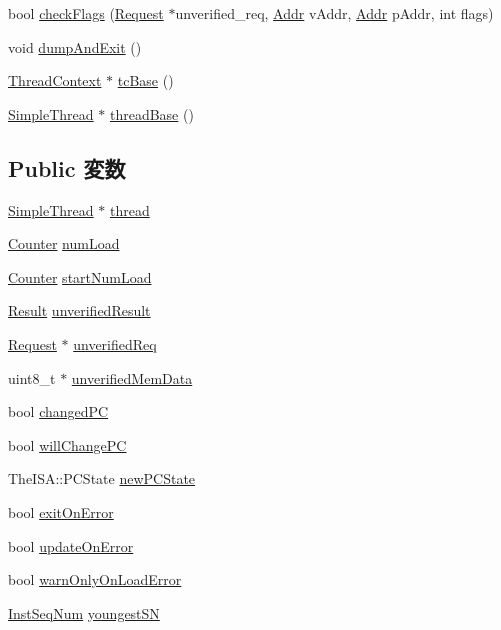 \begin{DoxyCompactItemize}
bool \hyperlink{classCheckerCPU_ab6e89553924f128af246935e240b11a4}{checkFlags} (\hyperlink{classRequest}{Request} $\ast$unverified\_\-req, \hyperlink{base_2types_8hh_af1bb03d6a4ee096394a6749f0a169232}{Addr} vAddr, \hyperlink{base_2types_8hh_af1bb03d6a4ee096394a6749f0a169232}{Addr} pAddr, int flags)
\item 
void \hyperlink{classCheckerCPU_a516e77319e399949d9137957cd9970d0}{dumpAndExit} ()
\item 
\hyperlink{classThreadContext}{ThreadContext} $\ast$ \hyperlink{classCheckerCPU_ad33756f3e96ee445dca8d69b1dd8709c}{tcBase} ()
\item 
\hyperlink{classSimpleThread}{SimpleThread} $\ast$ \hyperlink{classCheckerCPU_aed48fbbf4ee8e6fbb3ea13b1bbc23e2d}{threadBase} ()
\end{DoxyCompactItemize}
\subsection*{Public 変数}
\begin{DoxyCompactItemize}
\item 
\hyperlink{classSimpleThread}{SimpleThread} $\ast$ \hyperlink{classCheckerCPU_af9572fa907cd21b54cb14bd626010d39}{thread}
\item 
\hyperlink{base_2types_8hh_ae1475755791765b8e6f6a8bb091e273e}{Counter} \hyperlink{classCheckerCPU_a9c78b70028e5df92b15a6fd9c56e5acf}{numLoad}
\item 
\hyperlink{base_2types_8hh_ae1475755791765b8e6f6a8bb091e273e}{Counter} \hyperlink{classCheckerCPU_abc2dac603f413be8cd5f63b5c0b2d48d}{startNumLoad}
\item 
\hyperlink{unionCheckerCPU_1_1Result}{Result} \hyperlink{classCheckerCPU_ae44d4afdef854be5de937985e00e162c}{unverifiedResult}
\item 
\hyperlink{classRequest}{Request} $\ast$ \hyperlink{classCheckerCPU_a398733bcf03e60981cf4b3cc79f339cb}{unverifiedReq}
\item 
uint8\_\-t $\ast$ \hyperlink{classCheckerCPU_a6840f1942d66e27328010652fcc83cc4}{unverifiedMemData}
\item 
bool \hyperlink{classCheckerCPU_ab07cf1e394193718234cec904fc62402}{changedPC}
\item 
bool \hyperlink{classCheckerCPU_a4f3f7f9c8e8331d34afcddc9d9cf1db7}{willChangePC}
\item 
TheISA::PCState \hyperlink{classCheckerCPU_a0881ee85f2e8edfb21d616268ddbc181}{newPCState}
\item 
bool \hyperlink{classCheckerCPU_a69729b3e0649fedb790e5fa822712b63}{exitOnError}
\item 
bool \hyperlink{classCheckerCPU_a5c4b1a378d5b47717f50008b307ed1fb}{updateOnError}
\item 
bool \hyperlink{classCheckerCPU_af590e28bcadd292986518887f8ba3498}{warnOnlyOnLoadError}
\item 
\hyperlink{inst__seq_8hh_a258d93d98edaedee089435c19ea2ea2e}{InstSeqNum} \hyperlink{classCheckerCPU_a258f3535e74a3e37e7c1afe9611266d2}{youngestSN}
\end{DoxyCompactItemize}
